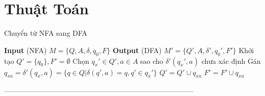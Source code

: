 \documentclass[14pt]{extreport}
\begin{document}
\chapter{Thuật Toán}
\begin{algorithm}[H]
\caption{Chuyển từ NFA sang DFA}
\begin{algorithmic} 
\STATE \textbf{Input} (NFA) $M = \{Q, A, \delta, q_0, F\}$
\STATE \textbf{Output} (DFA) $M' = \{Q', A, \delta', q_0', F'\}$
\STATE Khởi tạo $Q' = \{q_0\}, F' = \emptyset$
\STATE Chọn $q_x' \in Q', a \in A$ sao cho $\delta'(q_x', a)$ chưa xác định
\STATE Gán $q_{xa} = \delta'(q_x, a) = \{q \in Q | \delta(q', a) = q, q' \in q_x'\}$
\STATE $Q' = Q' \cup q_{xa}$
\ENDIF
{}
\STATE $F' = F' \cup q_{xa}$
\ENDIF
\ENDWHILE
\end{algorithmic}
\end{algorithm}
--------------------------------------------------------------------------------\\
\end{document}
